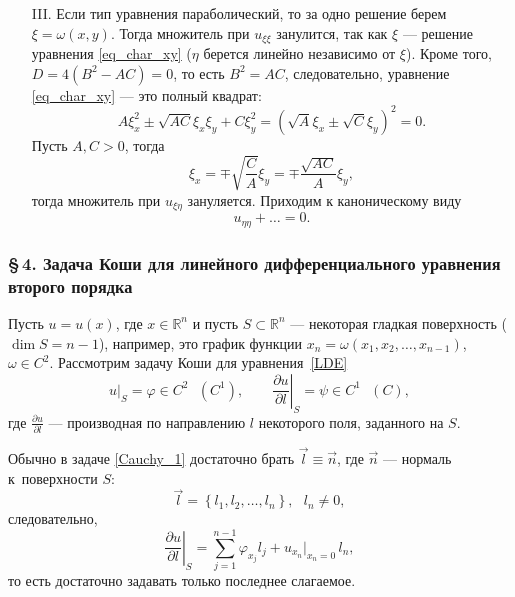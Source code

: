 \documentclass[12pt,a5paper]{book}
\begin{document}
\begin{itemize}
\begin{equation*}
		\end{equation*}
		\item [III.] Если тип уравнения параболический, то за одно решение берем $\xi = \omega(x,y)$. Тогда множитель при $u_{\xi\xi}$ занулится, так как $\xi$ --- решение уравнения \eqref{eq_char_xy} ($\eta$ берется линейно независимо от $\xi$). Кроме того, $D = 4(B^2 - AC) = 0$, то есть $B^2 = AC$, следовательно, уравнение \eqref{eq_char_xy} --- это полный квадрат:
		\begin{equation*}
			A\xi^2_x \pm \sqrt{AC}\xi_x\xi_y + C\xi^2_y = \left(\sqrt{A}\xi_x \pm \sqrt{C}\xi_y\right)^2 = 0.
		\end{equation*}
		Пусть $A, C > 0$, тогда
		\begin{equation*}
			\xi_x = \mp \sqrt{\frac{C}{A}}\xi_y = \mp \frac{\sqrt{AC}}{A}\xi_y,
		\end{equation*}
		тогда множитель при $u_{\xi\eta}$ зануляется. Приходим к каноническому виду
		\begin{equation*}
			u_{\eta\eta} + \dots = 0.
		\end{equation*}
	\end{itemize}

	\subsubsection*{\S\,4. Задача Коши для линейного дифференциального уравнения второго порядка}
	
	Пусть $u = u(x)$, где $x \in \mathbb{R}^n$ и пусть $S \subset \mathbb{R}^n$ --- некоторая гладкая поверхность ($\dim{S} = n - 1$), например, это график функции $x_n = \omega(x_1, x_2, \dots, x_{n-1})$, $\omega \in C^2$.  Рассмотрим задачу Коши для уравнения~\eqref{LDE}
	\begin{equation}\label{Cauchy_1}
		u\big|_S = \varphi \in C^2\text{ }(C^1), \qquad \left.\frac{\partial u}{\partial l}\right|_S = \psi \in C^1\text{ }(C),
	\end{equation}
	где $\frac{\partial u}{\partial l}$ --- производная по направлению $l$ некоторого поля, заданного на $S$.
	
	Обычно в задаче \eqref{Cauchy_1} достаточно брать $\vec{l} \equiv \vec{n}$, где $\vec{n}$ --- нормаль к~поверхности $S$:
	\begin{equation*}
		\vec{l} = \left\{l_1,l_2,\dots,l_n\right\},\text{ } l_n \neq 0,
	\end{equation*}
	следовательно,
	\begin{equation*}
		\left.\frac{\partial u}{\partial l}\right|_S = \sum_{j=1}^{n-1}\varphi_{x_j}l_j + u_{x_n}\big|_{x_n=0}\,l_n,
	\end{equation*}
	то есть достаточно задавать только последнее слагаемое.
	
\end{document}
